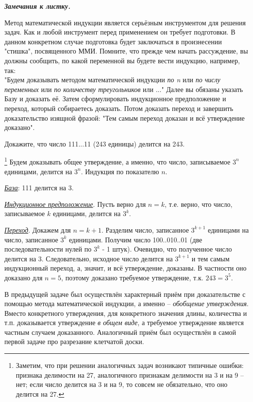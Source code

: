 \textbf{\textit{Замечания к листку.}}
\par
Метод математической индукции является серьёзным инструментом для решения задач. Как и любой инструмент перед применением он требует подготовки. В данном конкретном случае подготовка будет заключаться в произнесении "стишка", посвященного ММИ. Помните, что прежде чем начать рассуждение,
вы должны сообщить, по какой переменной вы будете вести индукцию, например, так:
\\
"Будем доказывать методом математической индукции \textit{по n} или \textit{по числу переменных} или \textit{по количеству треугольников} или ..." Далее вы обязаны указать Базу и доказать её. Затем сформулировать индукционное предположение и переход, который собираетесь доказать. Потом доказать переход и завершить доказательство изящной фразой: "Тем самым переход доказан и всё утверждение доказано".

\newpage

\begin{thm}
Докажите, что число 111...11 (243 единицы) делится на 243.
\end{thm}

\begin{prf}\footnote{Заметим, что при решении аналогичных задач возникают типичные ошибки: признака делимости на 27, аналогичного признакам делимости на 3 и на 9 – нет; если число делится на 3 и на 9, то совсем не обязательно, что оно делится на 27.}
Будем доказывать общее утверждение, а именно, что число, записываемое $3^n$ единицами, делится на $3^n$. Индукция по показателю $n$.
\par
\textit{\underline{База}}: 111 делится на 3.  
\par
\textit{\underline{Индукционное предположение}}. Пусть верно для $n = k$, т.е. верно, что число, записываемое $k$ единицами, делится на $3^k$.
\par
\textit{\underline{Переход}}. Докажем для $n = k + 1$. Разделим число, записанное $3^{k+1}$ единицами на число, записанное $3^k$ единицами. Получим число 100..010..01 (две последовательности нулей по $3^k$ - 1 штук). Очевидно, что полученное число делится на 3. Следовательно, исходное число делится на $3^{k+1}$ и тем самым индукционный переход, а, значит, и всё утверждение, доказаны. В частности оно доказано для $n = 5$, поэтому доказано требуемое утверждение, т.к. $243 = 3^5$.
\end{prf}

В предыдущей задаче был осуществлён характерный приём при доказательстве с помощью метода математической индукции, а именно – \textit{обобщение утверждения}. Вместо конкретного утверждения, для конкретного значения длины, количества и т.п. доказывается утверждение \textit{в общем виде}, а требуемое утверждение является частным случаем доказанного. Аналогичный приём был осуществлён в самой первой задаче про разрезание клетчатой доски.

